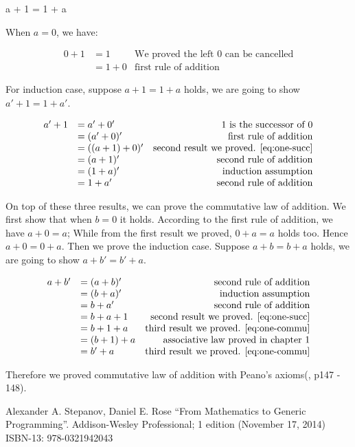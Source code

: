 \documentclass[UTF8]{article}
\begin{document}
\be
a + 1 = 1 + a
\label{eq:one-commu}
\ee

When $a = 0$, we have:

\[
\begin{array}{rlr}
0 + 1 & = 1 & \text{We proved the left 0 can be cancelled} \\
      & = 1 + 0 & \text{first rule of addition}
\end{array}
\]

For induction case, suppose $a + 1 = 1 + a$ holds, we are going to show $a' + 1 = 1 + a'$.

\[
\begin{array}{rlr}
a' + 1 & = a' + 0' & \text{1 is the successor of 0} \\
       & = (a' + 0)' & \text{first rule of addition} \\
       & = ((a + 1) + 0)' & \text{second result we proved. \cref{eq:one-succ}} \\
       & = (a + 1)' & \text{second rule of addition} \\
       & = (1 + a)' & \text{induction assumption} \\
       & = 1 + a' & \text{second rule of addition}
\end{array}
\]

On top of these three results, we can prove the commutative law of addition. We first show that when $b = 0$ it holds. According to the first rule of addition, we have $a + 0 = a$; While from the first result we proved, $0 + a = a$ holds too. Hence $a + 0 = 0 + a$. Then we prove the induction case. Suppose $a + b = b + a$ holds, we are going to show $a + b' = b' + a$.

\[
\begin{array}{rlr}
a + b' & = (a + b)' & \text{second rule of addition} \\
       & = (b + a)' & \text{induction assumption} \\
       & = b + a' & \text{second rule of addition} \\
       & = b + a + 1 & \text{second result we proved. \cref{eq:one-succ}} \\
       & = b + 1 + a & \text{third result we proved. \cref{eq:one-commu}} \\
       & = (b + 1) + a & \text{associative law proved in chapter 1} \\
       & = b' + a & \text{third result we proved. \cref{eq:one-commu}}
\end{array}
\]

Therefore we proved commutative law of addition with Peano's axioms(\cite{StepanovRose15}, p147 - 148).

\ifx\wholebook\relax \else
\begin{thebibliography}{99}

Alexander A. Stepanov, Daniel E. Rose ``From Mathematics to Generic Programming''. Addison-Wesley Professional; 1 edition (November 17, 2014) ISBN-13: 978-0321942043

\end{thebibliography}

\expandafter\enddocument

\fi
\end{document}
